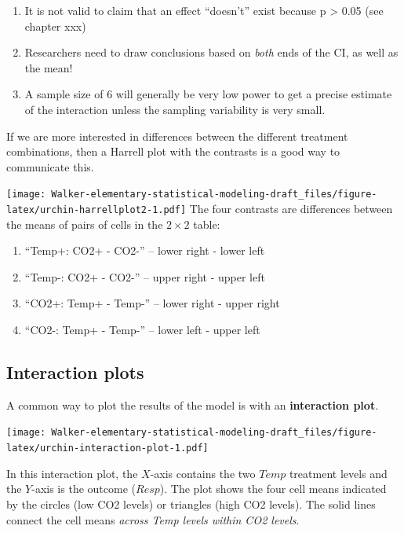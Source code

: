 \documentclass[]{book}
\providecommand{\tightlist}{%
  \setlength{\itemsep}{0pt}\setlength{\parskip}{0pt}}
\theoremstyle{definition}
\theoremstyle{definition}
\theoremstyle{definition}
\theoremstyle{remark}
\begin{document}
\begin{enumerate}
\def\labelenumi{\arabic{enumi}.}
\tightlist
\item
  It is not valid to claim that an effect ``doesn't'' exist because p
  \textgreater{} 0.05 (see chapter xxx)
\item
  Researchers need to draw conclusions based on \emph{both} ends of the
  CI, as well as the mean!
\item
  A sample size of 6 will generally be very low power to get a precise
  estimate of the interaction unless the sampling variability is very
  small.
\end{enumerate}

If we are more interested in differences between the different treatment
combinations, then a Harrell plot with the contrasts is a good way to
communicate this.

\texttt{[image: Walker-elementary-statistical-modeling-draft\_files/figure-latex/urchin-harrellplot2-1.pdf]}
The four contrasts are differences between the means of pairs of cells
in the \(2 \times 2\) table:

\begin{enumerate}
\def\labelenumi{\arabic{enumi}.}
\tightlist
\item
  ``Temp+: CO2+ - CO2-'' -- lower right - lower left
\item
  ``Temp-: CO2+ - CO2-'' -- upper right - upper left
\item
  ``CO2+: Temp+ - Temp-'' -- lower right - upper right
\item
  ``CO2-: Temp+ - Temp-'' -- lower left - upper left
\end{enumerate}

\subsection{Interaction plots}\label{interaction-plots}

A common way to plot the results of the model is with an
\textbf{interaction plot}.

\texttt{[image: Walker-elementary-statistical-modeling-draft\_files/figure-latex/urchin-interaction-plot-1.pdf]}

In this interaction plot, the \(X\)-axis contains the two \(Temp\)
treatment levels and the \(Y\)-axis is the outcome (\(Resp\)). The plot
shows the four cell means indicated by the circles (low CO2 levels) or
triangles (high CO2 levels). The solid lines connect the cell means
\emph{across Temp levels within CO2 levels}.
\end{document}
